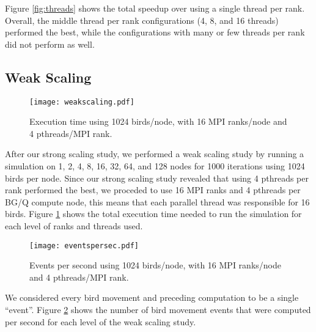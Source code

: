 Figure \ref{fig:threads} shows the total speedup over using a single
thread per rank.  Overall, the middle thread per rank configurations
(4, 8, and 16 threads) performed the best, while the configurations
with many or few threads per rank did not perform as well.

\subsection*{Weak Scaling}
\FloatBarrier
\begin{figure}[h!]
  \centering
  \texttt{[image: weakscaling.pdf]}
  \caption{Execution time using 1024 birds/node, with 16 MPI
    ranks/node and 4 pthreads/MPI rank.\label{fig:weakscaling}}
\end{figure}

After our strong scaling study, we performed a weak scaling study by
running a simulation on 1, 2, 4, 8, 16, 32, 64, and 128 nodes for 1000
iterations using 1024 birds per node. Since our strong scaling study
revealed that using 4 pthreads per rank performed the best, we
proceded to use 16 MPI ranks and 4 pthreads per BG/Q compute node,
this means that each parallel thread was responsible for 16
birds. Figure \ref{fig:weakscaling} shows the total execution time
needed to run the simulation for each level of ranks and threads used.

\begin{figure}[h!]
  \centering
  \texttt{[image: eventspersec.pdf]}
  \caption{Events per second using 1024 birds/node, with 16 MPI
    ranks/node and 4 pthreads/MPI rank.\label{fig:eventspersec}}
\end{figure}

We considered every bird movement and preceding computation to be a
single ``event''.  Figure \ref{fig:eventspersec} shows the number of
bird movement events that were computed per second for each level of
the weak scaling study.
